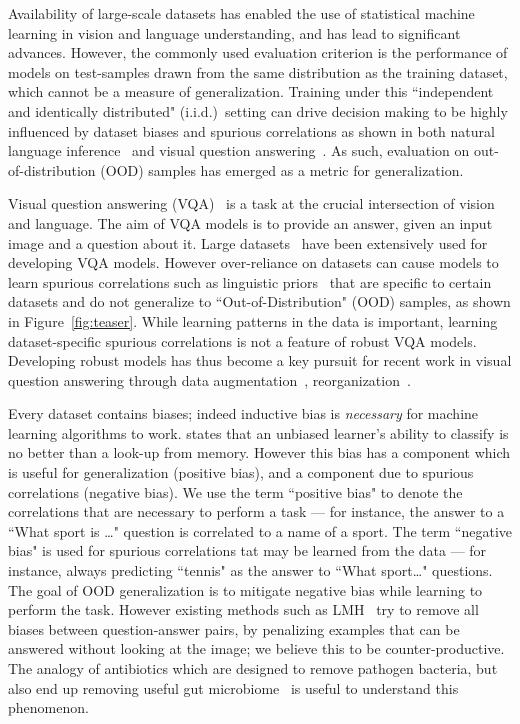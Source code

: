 Availability of large-scale datasets has enabled the use of statistical machine learning in vision and language understanding, and has lead to significant advances.
However, the commonly used evaluation criterion is the performance of models on test-samples drawn from the same distribution as the training dataset, which cannot be a measure of generalization.
Training under this ``independent and identically distributed" (i.i.d.)~setting can drive decision making to be highly influenced by dataset biases and spurious correlations as shown in both natural language inference~\citep{kaushik2018much,poliak2018hypothesis,mccoy2019right} and visual question answering~\citep{goyal2017making,vqa-cp,selvaraju2020squinting}.
As such, evaluation on out-of-distribution (OOD) samples has emerged as a metric for generalization.

Visual question answering (VQA)~\citep{antol2015vqa} is a task at the crucial intersection of vision and language.
The aim of VQA models is to provide an answer, given an input image and a question about it.
Large datasets~\citep{antol2015vqa} have been extensively used for developing VQA models.
However over-reliance on datasets can cause models to learn spurious correlations such as linguistic priors~\citep{vqa-cp} that are specific to certain datasets and do not generalize to ``Out-of-Distribution" (OOD) samples, as shown in Figure~\ref{fig:teaser}.
While learning patterns in the data is important, learning dataset-specific spurious correlations is not a feature of robust VQA models.
Developing robust models has thus become a key pursuit for recent work in visual question answering through data augmentation~\citep{goyal2017making}, reorganization~\citep{vqa-cp}.

Every dataset contains biases; indeed inductive bias is \textit{necessary} for machine learning algorithms to work.
\citet{mitchell1980need} states that an unbiased learner's ability to classify is no better than a look-up from memory.
However this bias has a component which is useful for generalization (positive bias), and a component due to spurious correlations (negative bias).
We use the term ``positive bias" to denote the correlations that are necessary to perform a task --- for instance, the answer to a ``What sport is \dots" question is correlated to a name of a sport.
The term ``negative bias" is used for spurious correlations tat may be learned from the data --- for instance, always predicting ``tennis" as the answer to ``What sport\dots" questions.
The goal of OOD generalization is to mitigate negative bias while learning to perform the task.
However existing methods such as LMH~\citep{clark2019don}
try to remove all biases between question-answer pairs, by penalizing examples that can be answered without looking at the image;
we believe this to be counter-productive.
The analogy of antibiotics which are designed to remove pathogen bacteria, but also end up removing useful gut microbiome~\citep{willing2011shifting} is useful to understand this phenomenon.

